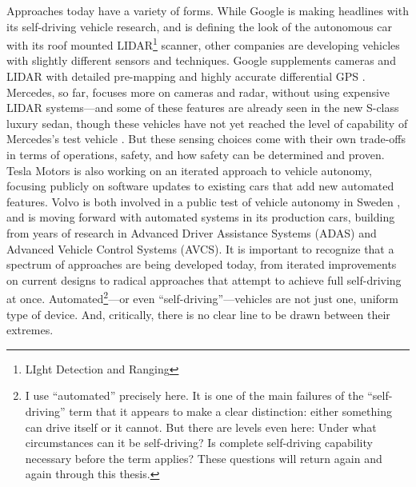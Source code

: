 
Approaches today have a variety of forms. While Google is making
headlines with its self-driving vehicle research, and is defining the
look of the autonomous car with its roof mounted LIDAR\footnote{LIght
  Detection and Ranging} scanner, other
companies are developing vehicles with slightly different sensors and
techniques. Google supplements cameras and LIDAR with detailed pre-mapping and highly accurate
differential GPS \cite{guizzoHow}. Mercedes, so far, focuses more on
cameras and radar, 
without using expensive LIDAR systems---and some of these features are
already seen in the new S-class luxury sedan, though these vehicles
have not yet reached the level of capability of Mercedes's
test vehicle \cite{makingBertha}. But these sensing choices come with their own
trade-offs in terms of operations, safety, and how safety can be
determined and proven. Tesla Motors
is also working on an iterated 
approach to vehicle autonomy, focusing publicly on software updates to
existing cars that add new automated features. Volvo is both involved
in a public test of vehicle autonomy in Sweden \cite{volvoPR}, and is moving forward
with automated systems in its production cars, building from years of
research in Advanced Driver Assistance Systems (ADAS) and Advanced
Vehicle Control Systems (AVCS). It is important to recognize that
a spectrum of approaches are being developed today, from iterated
improvements on current designs to radical approaches that attempt to
achieve full self-driving at once. Automated\footnote{I use ``automated''
  precisely here. It is one of the main failures of the
  ``self-driving'' term that it appears to make a clear distinction: 
  either something can drive itself or it cannot. But there are
  levels even here: Under what circumstances can it be self-driving? Is
  complete self-driving capability necessary before the term applies?
  These questions will return again and again through this thesis. }---or even
``self-driving''---vehicles are not just one, uniform type of
device. And, critically, there is no clear
line to be drawn between their extremes.




